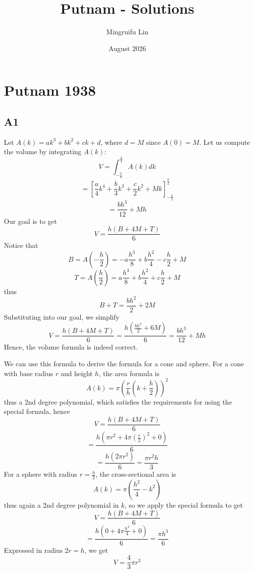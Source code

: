 \documentclass{book}
\title{Putnam - Solutions}
\author{Mingruifu Lin}
\date{August 2026}
\begin{document}
\maketitle

\tableofcontents

\chapter{Putnam 1938}

\section*{A1}
Let $A(k) = ak^3 + bk^2 + ck + d$, where $d = M$ since $A(0) = M$. Let us compute the volume by integrating $A(k)$:
$$V = \int_{-\frac{h}{2}}^{\frac{h}{2}} A(k) dk$$
$$= \left[ \frac{a}{4}k^4 + \frac{b}{3}k^3 + \frac{c}{2}k^2 + Mk \right]_{-\frac{h}{2}}^{\frac{h}{2}}$$
$$= \frac{bh^3}{12} + Mh$$
Our goal is to get
$$V = \frac{h(B + 4M + T)}{6}$$
Notice that
$$B = A \left( -\frac{h}{2} \right) = -a \frac{h^3}{8} + b \frac{h^2}{4} - c \frac{h}{2} + M$$
$$T = A \left( \frac{h}{2} \right) = a \frac{h^3}{8} + b \frac{h^2}{4} + c \frac{h}{2} + M$$
thus
$$B + T = \frac{bh^2}{2} + 2M$$
Substituting into our goal, we simplify
$$V = \frac{h(B + 4M + T)}{6} = \frac{h(\frac{bh^2}{2} + 6M)}{6} = \frac{bh^3}{12} + Mh$$
Hence, the volume formula is indeed correct.

We can use this formula to derive the formula for a cone and sphere. For a cone with base radius $r$ and height $h$, the area formula is
$$A(k) = \pi \left( \frac{r}{h} \left( k + \frac{h}{2} \right) \right)^2$$
thus a 2nd degree polynomial, which satisfies the requirements for using the special formula, hence
$$V = \frac{h(B + 4M + T)}{6}$$
$$= \frac{h(\pi r^2 + 4 \pi \left( \frac{r}{2} \right)^2 + 0)}{6}$$
$$= \frac{h(2 \pi r^2)}{6} = \frac{\pi r^2 h}{3}$$
For a sphere with radius $r = \frac{h}{2}$, the cross-sectional area is 
$$A(k) = \pi \left( \frac{h^2}{4} - k^2 \right)$$
thus again a 2nd degree polynomial in $k$, so we apply the special formula to get
$$V = \frac{h(B + 4M + T)}{6}$$
$$= \frac{h(0 + 4 \pi \frac{h^2}{4} + 0)}{6} = \frac{\pi h^3}{6}$$
Expressed in radius $2r = h$, we get
$$V = \frac{4}{3} \pi r^3$$
\end{document}
